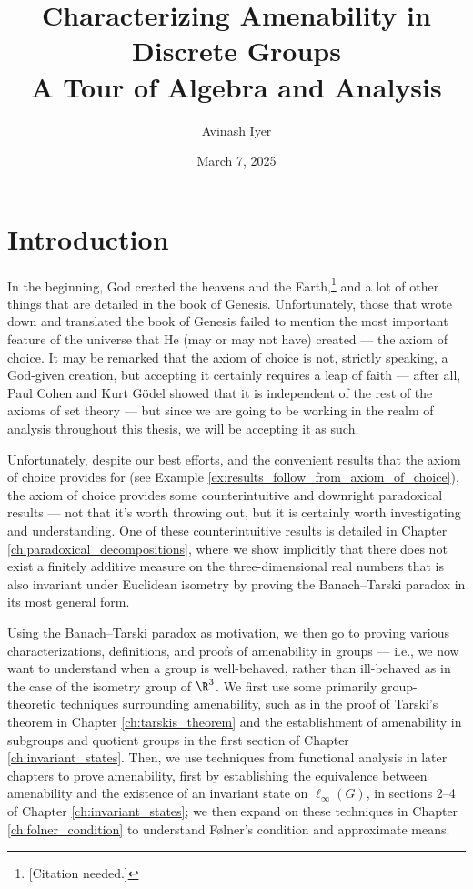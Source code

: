 \documentclass[11pt]{package2}
\title{Characterizing Amenability in Discrete Groups\\{\large A Tour of Algebra and Analysis}}
\author{Avinash Iyer}
\date{March 7, 2025}
\begin{document}
\maketitle
\RaggedRight
\tableofcontents
\chapter{Introduction}
In the beginning, God created the heavens and the Earth,\footnote{[Citation needed.]} and a lot of other things that are detailed in the book of Genesis. Unfortunately, those that wrote down and translated the book of Genesis failed to mention the most important feature of the universe that He (may or may not have) created --- the axiom of choice. It may be remarked that the axiom of choice is not, strictly speaking, a God-given creation, but accepting it certainly requires a leap of faith --- after all, Paul Cohen and Kurt Gödel showed that it is independent of the rest of the axioms of set theory --- but since we are going to be working in the realm of analysis throughout this thesis, we will be accepting it as such.\newline

Unfortunately, despite our best efforts, and the convenient results that the axiom of choice provides for (see Example \ref{ex:results_follow_from_axiom_of_choice}), the axiom of choice provides some counterintuitive and downright paradoxical results --- not that it's worth throwing out, but it is certainly worth investigating and understanding. One of these counterintuitive results is detailed in Chapter \ref{ch:paradoxical_decompositions}, where we show implicitly that there does not exist a finitely additive measure on the three-dimensional real numbers that is also invariant under Euclidean isometry by proving the Banach--Tarski paradox in its most general form.\newline

Using the Banach--Tarski paradox as motivation, we then go to proving various characterizations, definitions, and proofs of amenability in groups --- i.e., we now want to understand when a group is well-behaved, rather than ill-behaved as in the case of the isometry group of $\R^3$. We first use some primarily group-theoretic techniques surrounding amenability, such as in the proof of Tarski's theorem in Chapter \ref{ch:tarskis_theorem} and the establishment of amenability in subgroups and quotient groups in the first section of Chapter \ref{ch:invariant_states}. Then, we use techniques from functional analysis in later chapters to prove amenability, first by establishing the equivalence between amenability and the existence of an invariant state on $\ell_{\infty}(G)$, in sections 2--4 of Chapter \ref{ch:invariant_states}; we then expand on these techniques in Chapter \ref{ch:folner_condition} to understand Følner's condition and approximate means.\newline
\end{document}
